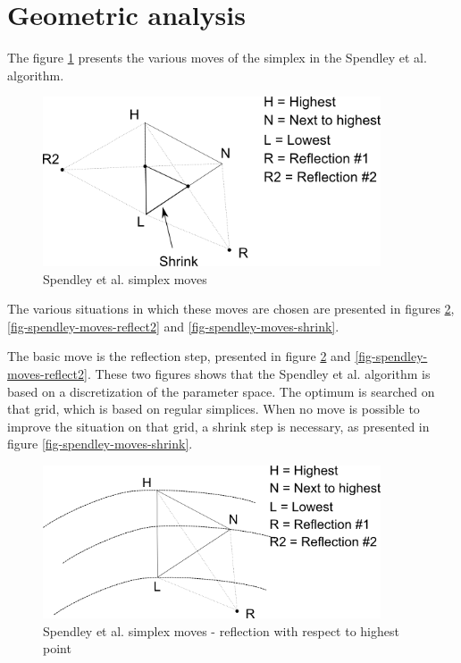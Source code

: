 \section{Geometric analysis}

The figure \ref{fig-spendley-moves} presents the various moves of the 
simplex in the Spendley et al. algorithm.

\begin{figure}
\begin{center}
\includegraphics[width=10cm]{spendley-steps.png}
\end{center}
\caption{Spendley et al. simplex moves}
\label{fig-spendley-moves}
\end{figure}

The various situations in which these moves are chosen are 
presented in figures \ref{fig-spendley-moves-reflect}, \ref{fig-spendley-moves-reflect2}
and \ref{fig-spendley-moves-shrink}.

The basic move is the reflection step, presented in figure 
\ref{fig-spendley-moves-reflect} and \ref{fig-spendley-moves-reflect2}. 
These two figures shows that the Spendley et al.
algorithm is based on a discretization of the parameter space. 
The optimum is searched on that grid, which is based on regular simplices.
When no move is possible to improve the situation on that grid,
a shrink step is necessary, as presented in figure \ref{fig-spendley-moves-shrink}.

\begin{figure}
\begin{center}
\includegraphics[width=10cm]{spendley-steps-reflect.png}
\end{center}
\caption{Spendley et al. simplex moves - reflection with respect to highest point}
\label{fig-spendley-moves-reflect}
\end{figure}

